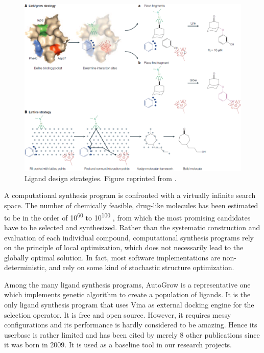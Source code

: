 \begin{figure}[t]
\centering
\includegraphics[width=\textwidth]{igrow/LigandDesign.png}
\caption{Ligand design strategies. Figure reprinted from \citep{363}.}
\label{igrow:LigandDesign}
\end{figure}

A computational synthesis program is confronted with a virtually infinite search space. The number of chemically feasible, drug-like molecules has been estimated to be in the order of 10\textsuperscript{60} to 10\textsuperscript{100} \citep{363}, from which the most promising candidates have to be selected and synthesized. Rather than the systematic construction and evaluation of each individual compound, computational synthesis programs rely on the principle of local optimization, which does not necessarily lead to the globally optimal solution. In fact, most software implementations \citep{466,749} are non-deterministic, and rely on some kind of stochastic structure optimization.

Among the many ligand synthesis programs, AutoGrow \citep{466} is a representative one which implements genetic algorithm to create a population of ligands. It is the only ligand synthesis program that uses Vina \citep{595} as external docking engine for the selection operator. It is free and open source. However, it requires messy configurations and its performance is hardly considered to be amazing. Hence its userbase is rather limited and has been cited by merely 8 other publications since it was born in 2009. It is used as a baseline tool in our research projects.

